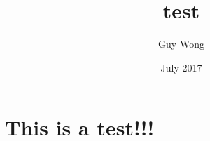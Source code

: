 \documentclass{article}
\title{test}
\author{Guy Wong}
\date{July 2017}
\begin{document}
\maketitle

\section{This is a test!!!}
\end{document}
